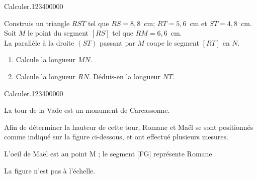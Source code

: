 \begin{pageParcoursd} 
 


 

 
 
\begin{ExoCd}{Calculer.}{1234}{0}{0}{0}{0}{0}

Construis un triangle $RST$ tel que $RS=8,8$~cm; $RT=5,6$~cm et
 $ST=4,8$~cm.  Soit $M$ le point du segment $[RS]$ tel que
 $RM=6,6$~cm.\\La parallèle à la droite $(ST)$ passant par $M$
 coupe le segment $[RT]$ en $N$.
\begin{enumerate}[leftmargin=*]
\item Calcule la longueur $MN$.
\item Calcule la longueur $RN$. Déduis-en la longueur $NT$.
\end{enumerate}

\end{ExoCd}
 

\begin{ExoCd}{Calculer.}{1234}{0}{0}{0}{0}{0}


La tour de la Vade est un monument de Carcassonne.


 Afin de déterminer la hauteur de cette tour, Romane et Maël se sont positionnés comme indiqué sur la figure ci-dessous, et ont effectué plusieurs mesures.

L'oeil de Maël est au point M ; le segment [FG] représente Romane.

La figure n'est pas à l'échelle.

\begin{center}


\end{center}
\end{ExoCd}
\end{pageParcoursd}
